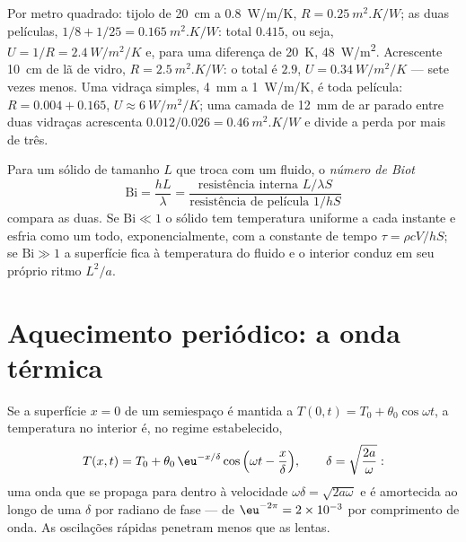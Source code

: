 \begin{example}\label{ex:b2:heat-conduction:wall}
Por metro quadrado: tijolo de \qty{20}{cm} a \qty{0.8}{W/m/K}, $R =
\qty{0.25}{m^2.K/W}$; as duas películas, $1/8 + 1/25 = \qty{0.165}{m^2.K/W}$:
total $0.415$, ou seja, $U = 1/R = \qty{2.4}{W/m^2/K}$ e, para uma diferença de \qty{20}{K},
\qty{48}{W/m^2}. Acrescente \qty{10}{cm} de lã de vidro, $R =
\qty{2.5}{m^2.K/W}$: o total é $2.9$, $U = \qty{0.34}{W/m^2/K}$ ---
sete vezes menos. Uma vidraça simples, \qty{4}{mm} a \qty{1}{W/m/K},
é toda película: $R = 0.004 + 0.165$, $U \approx \qty{6}{W/m^2/K}$; uma
camada de \qty{12}{mm} de ar parado entre duas vidraças acrescenta $0.012/0.026 =
\qty{0.46}{m^2.K/W}$ e divide a perda por mais de três.
\end{example}

\begin{definition}\label{def:b2:heat-conduction:biot}
Para um sólido de tamanho $L$ que troca com um fluido, o \emph{número
de Biot}
\[
\mathrm{Bi} = \frac{hL}{\lambda} = \frac{\text{resistência interna } L/\lambda S}{\text{resistência de película } 1/hS}
\]
compara as duas. Se $\mathrm{Bi} \ll 1$ o sólido tem temperatura uniforme
a cada instante e esfria como um todo, exponencialmente, com
a constante de tempo $\tau = \rho c V/hS$; se $\mathrm{Bi} \gg 1$ a
superfície fica à temperatura do fluido e o interior conduz em seu
próprio ritmo $L^2/a$.
\end{definition}

\section{Aquecimento periódico: a onda térmica}

\begin{proposition}\label{prop:b2:heat-conduction:wave}
Se a superfície $x = 0$ de um semiespaço é mantida a $T(0,t) = T_0 +
\theta_0\cos\omega t$, a temperatura no interior é, no regime
estabelecido,
\[
T(x,t) = T_0 + \theta_0\,\eu^{-x/\delta}\cos\Big(\omega t - \frac{x}{\delta}\Big),
\qquad \delta = \sqrt{\frac{2a}{\omega}} :
\]
uma onda que se propaga para dentro à velocidade $\omega\delta =
\sqrt{2a\omega}$ e é amortecida ao longo de uma \emph{} $\delta$
por radiano de fase --- de $\eu^{-2\pi} = 2 \times 10^{-3}$ por
comprimento de onda. As oscilações rápidas penetram menos que as lentas.
\end{proposition}

